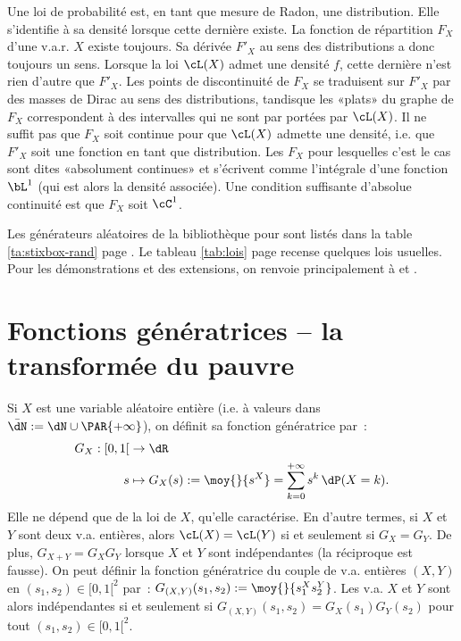{{\begin{remark}
  Une loi de probabilité est, en tant que mesure de Radon, une distribution.
  Elle s'identifie à sa densité lorsque cette dernière existe.  La fonction de
  répartition $F_X$ d'une v.a.r. $X$ existe toujours. Sa dérivée $F'_X$ au
  sens des distributions a donc toujours un sens. Lorsque la loi $\cL(X)$
  admet une densité $f$, cette dernière n'est rien d'autre que $F'_X$.  Les
  points de discontinuité de $F_X$ se traduisent sur $F'_X$ par des masses de
  Dirac au sens des distributions, tandisque les «plats» du graphe de $F_X$
  correspondent à des intervalles qui ne sont par portées par $\cL(X)$. Il ne
  suffit pas que $F_X$ soit continue pour que $\cL(X)$ admette une densité,
  i.e. que $F'_X$ soit une fonction en tant que distribution.  Les $F_X$ pour
  lesquelles c'est le cas sont dites «absolument continues» et s'écrivent
  comme l'intégrale d'une fonction $\bL^1$ (qui est alors la densité
  associée). Une condition suffisante d'absolue continuité est que $F_X$ soit
  $\cC^1$.
\end{remark}

\begin{remark}
  Les générateurs aléatoires de la bibliothèque \SB{} pour \ML{} sont listés
  dans la table \ref{ta:stixbox-rand} page \pageref{ta:stixbox-rand}.  Le
  tableau \ref{tab:lois} page \pageref{tab:lois} recense quelques lois
  usuelles. Pour les démonstrations et des extensions, on renvoie
  principalement à \cite{dacunha-castelle-duflo} et \cite{bouleau}.
\end{remark}

%
\section{Fonctions génératrices -- la transformée du pauvre}
%

Si $X$ est une variable aléatoire entière (i.e. à valeurs dans
$\bar{\dN}:=\dN\cup\PAR{+\infty}$), on définit sa fonction génératrice par~:
\begin{align*}
  G_X:[0,1[ & \to\dR \\
         s & \mapsto G_X(s):=\moy{}{s^X}=\sum_{k=0}^{+\infty}s^k\,\dP(X=k).
\end{align*}
Elle ne dépend que de la loi de $X$, qu'elle caractérise.  En d'autre termes,
si $X$ et $Y$ sont deux v.a. entières, alors $\cL(X)=\cL(Y)$ si et seulement
si $G_X=G_Y$. De plus, $G_{X+Y}=G_X G_Y$ lorsque $X$ et $Y$ sont indépendantes
(la réciproque est fausse). On peut définir la fonction génératrice du couple
de v.a. entières $(X,Y)$ en $(s_1,s_2)\in[0,1[^2$ par~:
$G_{(X,Y)}(s_1,s_2):=\moy{}{s_1^Xs_2^Y}$. Les v.a. $X$ et $Y$ sont alors
indépendantes si et seulement si $G_{(X,Y)}(s_1,s_2)=G_X(s_1)G_Y(s_2)$ pour
tout $(s_1,s_2)\in[0,1[^2$.

}}
